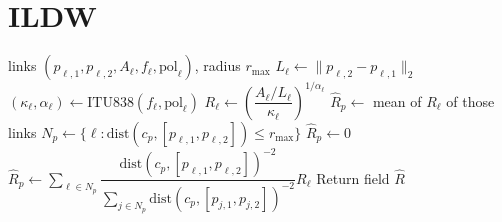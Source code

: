 \documentclass[11pt]{article}
\begin{document}
\section*{ILDW}
\begin{algorithm}[h]
\caption{Segment-Distance ILDW}
\begin{algorithmic}[1]
\Require links $(p_{\ell,1},p_{\ell,2},A_\ell,f_\ell,\mathrm{pol}_\ell)$, radius $r_{\max}$
\State $L_\ell \gets \|p_{\ell,2}-p_{\ell,1}\|_2$ 
\State $(\kappa_\ell,\alpha_\ell) \gets \mathrm{ITU838}(f_\ell,\mathrm{pol}_\ell)$
\State $R_\ell \gets \left(\dfrac{A_\ell/L_\ell}{\kappa_\ell}\right)^{1/\alpha_\ell}$ 
\EndFor
{}
\State $\hat R_p \gets$ mean of $R_\ell$ of those links 
\Else
\State $N_p \gets \{\ell : \mathrm{dist}(c_p,[p_{\ell,1},p_{\ell,2}]) \le r_{\max}\}$ 
\State $\hat R_p \gets 0$
\Else
\State $\hat R_p \gets \sum_{\ell\in N_p}\dfrac{\mathrm{dist}(c_p,[p_{\ell,1},p_{\ell,2}])^{-2}}{\sum_{j\in N_p}\mathrm{dist}(c_p,[p_{j,1},p_{j,2}])^{-2}} R_\ell$ 
\EndIf
\EndIf
\EndFor
\State Return field $\hat R$
\end{algorithmic}
\end{algorithm}
\end{document}
